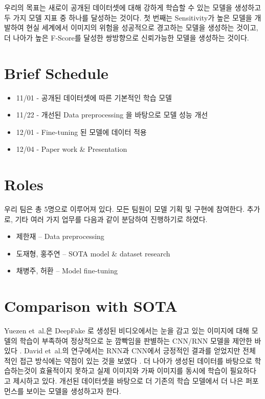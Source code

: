 \documentclass{article}
\begin{document}
우리의 목표는 새로이 공개된 데이터셋에 대해 강하게 학습할 수 있는 모델을 생성하고 두 가지 모델 지표 중 하나를 달성하는 것이다. 첫 번째는 Sensitivity가 높은 모델을 개발하여 현실 세계에서 이미지의 위험을 성공적으로 경고하는 모델을 생성하는 것이고, 더 나아가 높은 F-Score를 달성한 쌍방향으로 신뢰가능한 모델을 생성하는 것이다.

\section{Brief Schedule}

\begin{itemize}
	\item 11/01 - 공개된 데이터셋에 따른 기본적인 학습 모델
	\item 11/22 - 개선된 Data preprocessing 을 바탕으로 모델 성능 개선
	\item 12/01 - Fine-tuning 된 모델에 데이터 적용
	\item 12/04 - Paper work \& Presentation
\end{itemize}

\section{Roles}

우리 팀은 총 5명으로 이루어져 있다. 모든 팀원이 모델 기획 및 구현에 참여한다. 추가로, 기타 여러 가지 업무를 다음과 같이 분담하여 진행하기로 하였다.
\begin{itemize}
	\item 제한재 -- Data preprocessing
	\item 도재형, 홍주연 -- SOTA model \& dataset research
	\item 채병주, 허환 -- Model fine-tuning
\end{itemize}

\section{Comparison with SOTA}

Yuezen et~al.은 DeepFake 로 생성된 비디오에서는 눈을 감고 있는 이미지에 대해 모델의 학습이 부족하여 정상적으로 눈 깜빡임을 판별하는 CNN/RNN 모델을 제안한 바 있다 . David et~al.의 연구에서는 RNN과 CNN에서 긍정적인 결과를 얻었지만 전체적인 접근 방식에는 약점이 있는 것을 보였다 . 더 나아가 생성된 데이터를 바탕으로 학습하는것이 효율적이지 못하고 실제 이미지와 가짜 이미지를 동시에 학습이 필요하다고 제시하고 있다. 개선된 데이터셋을 바탕으로 더 기존의 학습 모델에서 더 나은 퍼포먼스를 보이는 모델을 생성하고자 한다.






\end{document}
